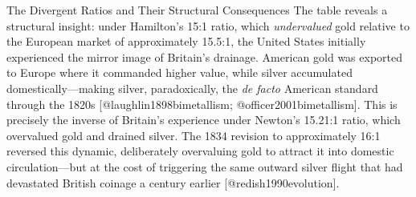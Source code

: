 \documentclass[
  ignorenonframetext,
]{beamer}
\begin{document}
\begin{frame}{The Divergent Ratios and Their Structural Consequences}
The table reveals a structural insight: under Hamilton's 15:1 ratio,
which \emph{undervalued} gold relative to the European market of
approximately 15.5:1, the United States initially experienced the mirror
image of Britain's drainage. American gold was exported to Europe where
it commanded higher value, while silver accumulated
domestically---making silver, paradoxically, the \emph{de facto}
American standard through the 1820s {[}@laughlin1898bimetallism;
@officer2001bimetallism{]}. This is precisely the inverse of Britain's
experience under Newton's 15.21:1 ratio, which overvalued gold and
drained silver. The 1834 revision to approximately 16:1 reversed this
dynamic, deliberately overvaluing gold to attract it into domestic
circulation---but at the cost of triggering the same outward silver
flight that had devastated British coinage a century earlier
{[}@redish1990evolution{]}.
\end{frame}
\end{document}
